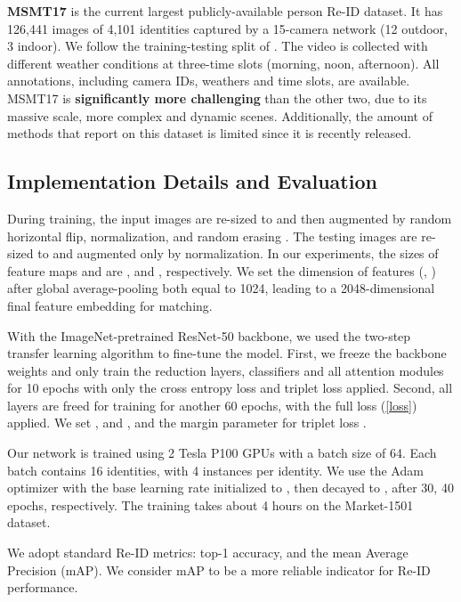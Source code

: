 \documentclass[10pt,twocolumn]{article}
\begin{document}
{\bf MSMT17} \cite{Wei_2018_CVPR} is the current largest publicly-available person Re-ID dataset. It has 126,441 images of 4,101 identities captured by a 15-camera network (12 outdoor, 3 indoor). We follow the training-testing split of \cite{Wei_2018_CVPR}. The video is collected with different weather conditions at three-time slots (morning, noon, afternoon). All annotations, including camera IDs, weathers and time slots, are available. MSMT17 is \textbf{significantly more challenging} than the other two, due to its massive scale, more complex and dynamic scenes. Additionally, the amount of methods that report on this dataset is limited since it is recently released.

\subsection{Implementation Details and Evaluation}
During training, the input images are re-sized to  and then augmented by random horizontal flip, normalization, and random erasing \cite{zhong2017random}. The testing images are re-sized to  and augmented only by normalization. In our experiments, the sizes of feature maps  and  are , and , respectively. We set the dimension of features (, ) after global average-pooling both equal to 1024, leading to a 2048-dimensional final feature embedding for matching.

With the ImageNet-pretrained ResNet-50 backbone, we used the two-step transfer learning algorithm \cite{geng2016deep} to fine-tune the model. First, we freeze the backbone weights and only train the reduction layers, classifiers and all attention modules for 10 epochs with only the cross entropy loss and triplet loss applied. Second, all layers are freed for training for another 60 epochs, with the full loss (\ref{loss}) applied. We set ,  and , and the margin parameter for triplet loss . 








Our network is trained using 2 Tesla P100 GPUs with a batch size of 64. Each batch contains 16 identities, with 4 instances per identity. We use the Adam optimizer with the base learning rate initialized to , then decayed to ,   after 30, 40 epochs, respectively. The training takes about 4 hours on the Market-1501 dataset.



We adopt standard Re-ID metrics: top-1 accuracy, and the mean Average Precision (mAP). We consider mAP to be a more reliable indicator for Re-ID performance. 
\end{document}

